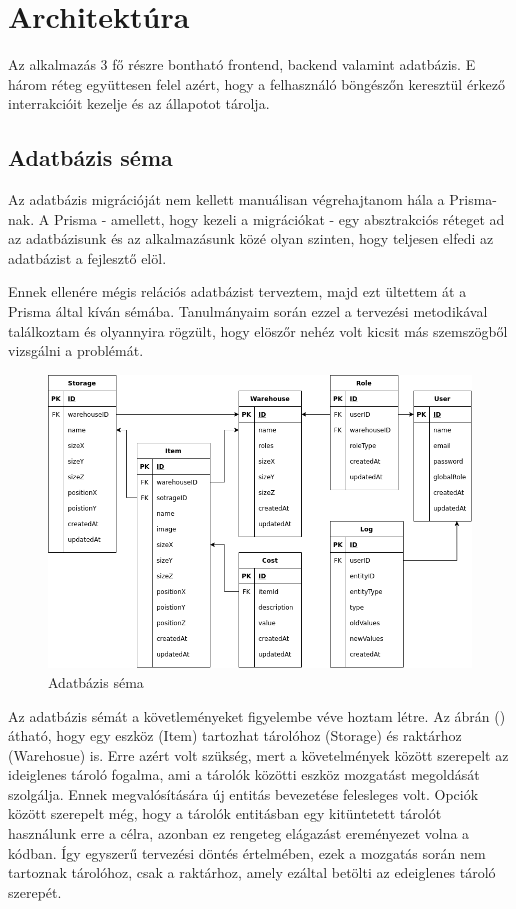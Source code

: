 \chapter{Architektúra}
Az alkalmazás 3 fő részre bontható frontend, backend valamint adatbázis.
E három réteg együttesen felel azért, hogy a felhasználó böngészőn keresztül érkező interrakcióit kezelje és az állapotot tárolja.

\section{Adatbázis séma}
Az adatbázis migrációját nem kellett manuálisan végrehajtanom hála a Prisma-nak. 
A Prisma - amellett, hogy kezeli a migrációkat - egy absztrakciós réteget ad az adatbázisunk és az alkalmazásunk közé olyan szinten, hogy teljesen elfedi az adatbázist a fejlesztő elöl.

Ennek ellenére mégis relációs adatbázist terveztem, majd ezt ültettem át a Prisma által kíván sémába.
Tanulmányaim során ezzel a tervezési metodikával találkoztam és olyannyira rögzült, hogy elöszőr nehéz volt kicsit más szemszögből vizsgálni a problémát.

\begin{figure}[!ht]
  \centering
  \includegraphics[width=150mm, keepaspectratio]{figures/db.png}
  \caption{Adatbázis séma}
  \label{fig:db}
\end{figure}

Az adatbázis sémát a követleményeket figyelembe véve hoztam létre.
Az ábrán () átható, hogy egy eszköz (Item) tartozhat tárolóhoz (Storage) és raktárhoz (Warehosue) is. 
Erre azért volt szükség, mert a követelmények között szerepelt az ideiglenes tároló fogalma, ami a tárolók közötti eszköz mozgatást megoldását szolgálja.
Ennek megvalósítására új entitás bevezetése felesleges volt. Opciók között szerepelt még, hogy a tárolók entitásban egy kitüntetett tárolót használunk erre a célra, azonban ez rengeteg elágazást ereményezet volna a kódban.
Így egyszerű tervezési döntés értelmében, ezek a mozgatás során nem tartoznak tárolóhoz, csak a raktárhoz, amely ezáltal betölti az edeiglenes tároló szerepét.

